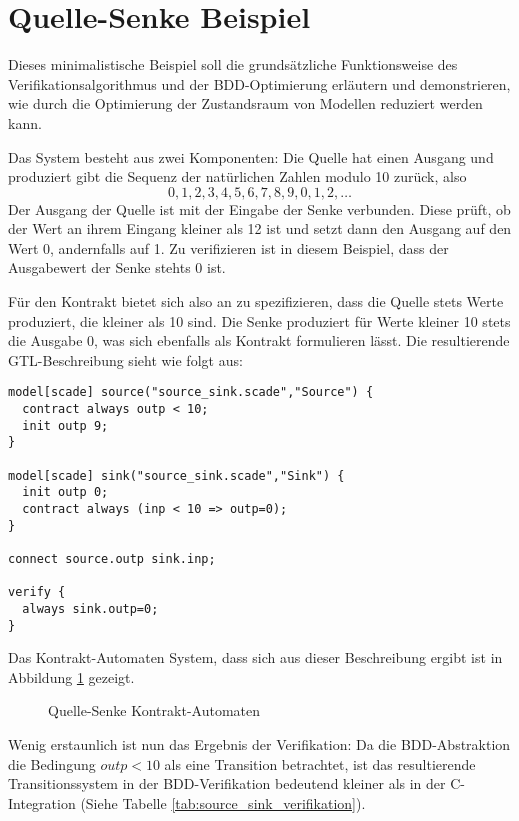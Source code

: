 \section{Quelle-Senke Beispiel}
Dieses minimalistische Beispiel soll die grundsätzliche Funktionsweise des Verifikationsalgorithmus und der BDD-Optimierung erläutern und demonstrieren, wie durch die Optimierung der Zustandsraum von Modellen reduziert werden kann.

Das System besteht aus zwei Komponenten:
Die Quelle hat einen Ausgang und produziert gibt die Sequenz der natürlichen Zahlen modulo 10 zurück, also
\[ 0,1,2,3,4,5,6,7,8,9,0,1,2,\dots \]
Der Ausgang der Quelle ist mit der Eingabe der Senke verbunden.
Diese prüft, ob der Wert an ihrem Eingang kleiner als 12 ist und setzt dann den Ausgang auf den Wert 0, andernfalls auf 1.
Zu verifizieren ist in diesem Beispiel, dass der Ausgabewert der Senke stehts 0 ist.

Für den Kontrakt bietet sich also an zu spezifizieren, dass die Quelle stets Werte produziert, die kleiner als 10 sind.
Die Senke produziert für Werte kleiner 10 stets die Ausgabe 0, was sich ebenfalls als Kontrakt formulieren lässt.
Die resultierende GTL-Beschreibung sieht wie folgt aus:
\begin{lstlisting}[language=gtl]
model[scade] source("source_sink.scade","Source") {
  contract always outp < 10;
  init outp 9;
}

model[scade] sink("source_sink.scade","Sink") {
  init outp 0;
  contract always (inp < 10 => outp=0);
}

connect source.outp sink.inp;

verify {
  always sink.outp=0;
}
\end{lstlisting}
Das Kontrakt-Automaten System, dass sich aus dieser Beschreibung ergibt ist in Abbildung \ref{fig:source_sink_automata} gezeigt.

\begin{figure}[h]
  \centering
  \begin{tikzpicture}
    
  \end{tikzpicture}
  \caption{Quelle-Senke Kontrakt-Automaten}
  \label{fig:source_sink_automata}
\end{figure}

Wenig erstaunlich ist nun das Ergebnis der Verifikation:
Da die BDD-Abstraktion die Bedingung $\mathit{outp}<10$ als eine Transition betrachtet, ist das resultierende Transitionssystem in der BDD-Verifikation bedeutend kleiner als in der C-Integration (Siehe Tabelle \ref{tab:source_sink_verifikation}).

